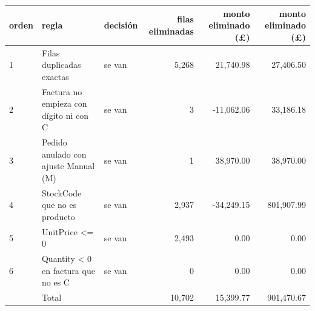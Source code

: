 \begin{tabular}{lllrrr}
\toprule
orden & regla & decisión & filas eliminadas & monto eliminado (\pounds{}) & \textbar{}monto\textbar{} eliminado (\pounds{}) \\
\midrule
1 & Filas duplicadas exactas & se van & 5,268 & 21,740.98 & 27,406.50 \\
2 & Factura no empieza con dígito ni con C & se van & 3 & -11,062.06 & 33,186.18 \\
3 & Pedido anulado con ajuste Manual (M) & se van & 1 & 38,970.00 & 38,970.00 \\
4 & StockCode que no es producto & se van & 2,937 & -34,249.15 & 801,907.99 \\
5 & UnitPrice <= 0 & se van & 2,493 & 0.00 & 0.00 \\
6 & Quantity < 0 en factura que no es C & se van & 0 & 0.00 & 0.00 \\
 & Total &  & 10,702 & 15,399.77 & 901,470.67 \\
\bottomrule
\end{tabular}